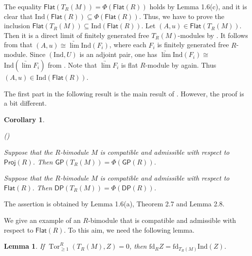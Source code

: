\documentclass[10pt,twoside]{amsart}
\theoremstyle{bfupright head,slanted body}
\theoremstyle{bfupright head,upright body}
\theoremstyle{fixed bf head,slanted body}
\newtheorem{cor}[res]{Corollary}        \newtheorem*{cor*}{Corollary}
\newtheorem{lem}[res]{Lemma}            \newtheorem*{lem*}{Lemma}
\theoremstyle{fixed bf head,upright body}
\theoremstyle{numbered paragraph}
\newlength{\thmlistleft}        %
\newlength{\thmlistright}       %
\newlength{\thmlistpartopsep}   %
\newlength{\thmlisttopsep}      %
\newlength{\thmlistparsep}      %
\newlength{\thmlistitemsep}     %
\newcounter{prt}
\newenvironment{prt}{\begin{list}{\upshape (\alph{prt})}%
    {\usecounter{prt}%
      \setlength{\leftmargin}{\thmlistleft}%
      \setlength{\labelwidth}{\thmlistleft}%
      \setlength{\rightmargin}{\thmlistright}%
      \setlength{\partopsep}{\thmlistpartopsep}%
      \setlength{\topsep}{\thmlisttopsep}%
      \setlength{\parsep}{\thmlistparsep}%
      \setlength{\itemsep}{\thmlistitemsep}}}%
  {\end{list}}%
\newenvironment{prf*}[1][Proof]{%
  \begin{proof}[\bf #1]
    \setcounter{equation}{0}
    \renewcommand{\theequation}{\arabic{equation}}}
  {\end{proof}
  }
\numberwithin{equation}{res}
\newcommand{\GP}{\mathsf{GP}}
\newcommand{\DP}{\mathsf{DP}}
\newcommand{\Proj}{\mathsf{Proj}}
\newcommand{\fd}{\mathrm{fd}}
\newcommand{\Flat}{\mathsf{Flat}}
\newcommand{\Ind}{\mathrm{Ind}}
\newcommand{\Tor}{\operatorname{Tor}}
\begin{document}
\begin{prf*}
The equality $\Flat(T_R(M))=\Phi(\Flat(R))$ holds by Lemma 1.6(c),
and it is clear that $\Ind(\Flat(R))\subseteq\Phi(\Flat(R))$. 
Thus, we have to prove the inclusion $\Flat(T_R(M)) \subseteq \Ind(\Flat(R))$.
Let $(A,u)\in\Flat(T_R(M))$. Then it is a direct limit of finitely generated free $T_R(M)$-modules
by \cite[Theorem 5.40]{Rot}. It follows from \cite[Lemma 1.7(c)]{DL} that $(A,u)\cong \underrightarrow{\lim}\Ind(F_{i})$, where each $F_{i}$ is finitely generated free $R$-module.
Since $(\Ind,U)$ is an adjoint pair, one has $\underrightarrow{\lim}\Ind(F_{i})\cong$ $\Ind(\underrightarrow{\lim}F_{i})$ from \cite[Theorem 5.43]{Rot}.
Note that $\underrightarrow{\lim}F_{i}$ is flat $R$-module by \cite[Theorem 5.40]{Rot} again.
Thus $(A,u)\in\Ind(\Flat(R))$.
\end{prf*}

The first part in the following result is the main result of \cite[Theorem 2.11]{DL}. However, the proof is a bit different.

\begin{cor}\label{G-proj}
\begin{prt}
\item
Suppose that the $R$-bimodule $M$  is compatible and admissible with respect to $\Proj(R)$. 
Then $\GP(T_R(M)) = \Phi(\GP(R))$.
\item
Suppose that the $R$-bimodule $M$  is compatible and admissible with respect to $\Flat(R)$. 
Then $\DP(T_R(M)) = \Phi(\DP(R))$.
\end{prt}
\end{cor}

\begin{prf*}
The assertion is obtained by Lemma 1.6(a), Theorem 2.7 and Lemma 2.8.
\end{prf*}

We give an example of an $R$-bimodule that is compatible and admissible with respect to $\Flat(R)$.
To this aim, we need the following lemma.

\begin{lem} 
If $\Tor_{\geqslant 1}^R(T_R(M), Z)=0$, then $\fd_R Z=\fd_{T_R(M)}\Ind(Z)$.
\end{lem}
\end{document}

